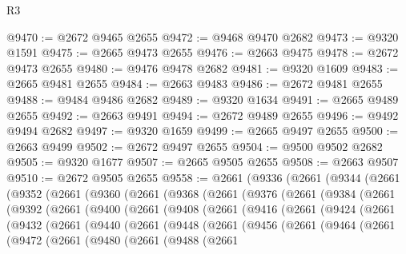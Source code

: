 \begin{lexlean}{R3}
\begin{coremodule}
@9470 := @2672 @9465 @2655
@9472 := @9468 @9470 @2682
@9473 := @9320 @1591
@9475 := @2665 @9473 @2655
@9476 := @2663 @9475
@9478 := @2672 @9473 @2655
@9480 := @9476 @9478 @2682
@9481 := @9320 @1609
@9483 := @2665 @9481 @2655
@9484 := @2663 @9483
@9486 := @2672 @9481 @2655
@9488 := @9484 @9486 @2682
@9489 := @9320 @1634
@9491 := @2665 @9489 @2655
@9492 := @2663 @9491
@9494 := @2672 @9489 @2655
@9496 := @9492 @9494 @2682
@9497 := @9320 @1659
@9499 := @2665 @9497 @2655
@9500 := @2663 @9499
@9502 := @2672 @9497 @2655
@9504 := @9500 @9502 @2682
@9505 := @9320 @1677
@9507 := @2665 @9505 @2655
@9508 := @2663 @9507
@9510 := @2672 @9505 @2655
@9558 := @2661
    (@9336
      (@2661
        (@9344
          (@2661
            (@9352
              (@2661
                (@9360
                  (@2661
                    (@9368
                      (@2661
                        (@9376
                          (@2661
                            (@9384
                              (@2661
                                (@9392
                                  (@2661
                                    (@9400
                                      (@2661
                                        (@9408
                                          (@2661
                                            (@9416
                                              (@2661
                                                (@9424
                                                  (@2661
                                                    (@9432
                                                      (@2661
                                                        (@9440
                                                          (@2661
                                                            (@9448
                                                              (@2661
                                                                (@9456
                                                                  (@2661
                                                                    (@9464
                                                                      (@2661
                                                                        (@9472
                                                                          (@2661
                                                                            (@9480
                                                                              (@2661
                                                                                (@9488
                                                                                  (@2661

\end{coremodule}
\end{lexlean}
